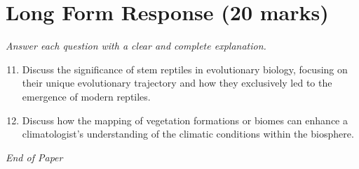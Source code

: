 \documentclass[12pt]{article}
\begin{document}
\section*{Long Form Response (20 marks)}
\textit{Answer each question with a clear and complete explanation.}
\begin{enumerate}[label=\arabic*.]
\setcounter{enumi}{10}
\item Discuss the significance of stem reptiles in evolutionary biology, focusing on their unique evolutionary trajectory and how they exclusively led to the emergence of modern reptiles.
\item Discuss how the mapping of vegetation formations or biomes can enhance a climatologist's understanding of the climatic conditions within the biosphere.
\end{enumerate}

\vfill
\noindent\textit{End of Paper}
\end{document}

